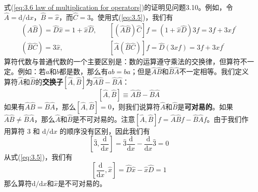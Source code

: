 	式(\ref{eq:3.6 law of multiplication for operators})的证明见问题3.10。例如，令$\hat{A} = \mathrm{d}/\mathrm{d}x$，$\hat{B} = \hat{x}$，而$\hat{C} = 3$。使用式(\ref{eq:3.5})，我们有
	\begin{equation*}
		\begin{aligned}
			\left(\hat{A}\hat{B}\right) = \hat{D}\hat{x} = 1+ \hat{x}\hat{D}, \quad & \left[\left(\hat{A}\hat{B}\right)\hat{C}\right]f = \left(1+\hat{x}\hat{D}\right)3f = 3f+3xf^{\prime}\\
			\left(\hat{B}\hat{C}\right) = 3\hat{x},  \qquad \quad \qquad & \left[\hat{A}\left(\hat{B}\hat{C}\right)\right]f = \hat{D}\left(3xf\right) = 3f+3xf^{\prime}
		\end{aligned}
	\end{equation*}
	\indent 算符代数与普通代数的一个主要区别是：数的运算遵守乘法的交换律，但算符不一定。例如：若$a$和$b$都是数，那么有$ab=ba$；但是$\hat{A}\hat{B}$和$\hat{B}\hat{A}$不一定相等。我们定义算符$\hat{A}$和$\hat{B}$的\textbf{交换子}$\left[\hat{A},\hat{B}\right]$为$\hat{A}\hat{B}-\hat{B}\hat{A}$：
	\begin{equation}
		\boxed{
			\left[\hat{A},\hat{B}\right] \equiv \hat{A}\hat{B} - \hat{B}\hat{A}
		}
		\label{eq:3.7 definition of commutator for two operators}
	\end{equation}
	如果有$\hat{A}\hat{B} = \hat{B}\hat{A}$，那么$\left[\hat{A},\hat{B}\right] = 0$，则我们说算符$\hat{A}$和$\hat{B}$是\textbf{可对易的}。如果$\hat{A}\hat{B} \neq \hat{B}\hat{A}$，那么$\hat{A}$和$\hat{B}$是不可对易的。注意$\left[\hat{A}, \hat{B}\right]f = \hat{A}\hat{B}f - \hat{B}\hat{A}f$。由于我们作用算符 3 和 $\mathrm{d}/\mathrm{d}x$ 的顺序没有区别，因此我们有
	\begin{equation*}
		\left[\hat{3},\frac{\mathrm{d}}{\mathrm{d}x}\right] = \hat{3}\frac{\mathrm{d}}{\mathrm{d}x} - \frac{\mathrm{d}}{\mathrm{d}x}\hat{3} = 0
	\end{equation*}
	\indent 从式(\ref{eq:3.5})，我们有
	\begin{equation}
		\left[\frac{\mathrm{d}}{\mathrm{d}x}, \hat{x}\right] = \hat{D}\hat{x}-\hat{x}\hat{D} = 1
		\label{eq:3.8}
	\end{equation}
	那么算符$\mathrm{d}/\mathrm{d}x$和$\hat{x}$是不可对易的。\\
